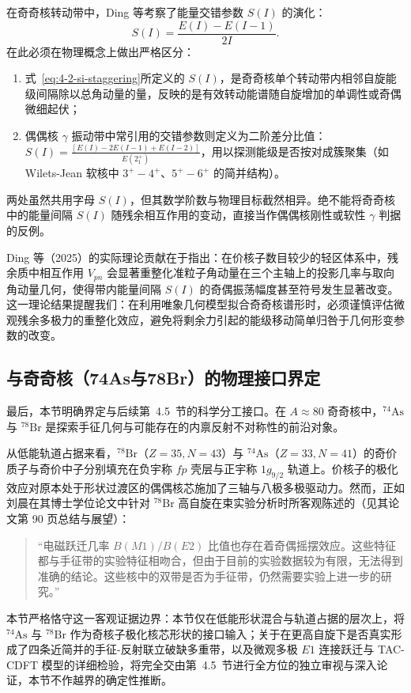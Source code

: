 在奇奇核转动带中，Ding 等考察了能量交错参数 $S(I)$ 的演化：
\begin{equation}\label{eq:4-2-si-staggering}
S(I) = \frac{E(I) - E(I-1)}{2I}.
\end{equation}
在此必须在物理概念上做出严格区分：
\begin{enumerate}
\item 式~\eqref{eq:4-2-si-staggering}所定义的 $S(I)$，是奇奇核单个转动带内相邻自旋能级间隔除以总角动量的量，反映的是有效转动能谱随自旋增加的单调性或奇偶微细起伏；
\item 偶偶核 $\gamma$ 振动带中常引用的交错参数则定义为二阶差分比值：$S(I) = \frac{[E(I) - 2E(I-1) + E(I-2)]}{E(2^+_1)}$，用以探测能级是否按对成簇聚集（如 Wilets-Jean 软核中 $3^+-4^+$、$5^+-6^+$ 的简并结构）。
\end{enumerate}
两处虽然共用字母 $S(I)$，但其数学阶数与物理目标截然相异。绝不能将奇奇核中的能量间隔 $S(I)$ 随残余相互作用的变动，直接当作偶偶核刚性或软性 $\gamma$ 判据的反例。

Ding 等（2025）的实际理论贡献在于指出：在价核子数目较少的轻区体系中，残余质中相互作用 $V_{pn}$ 会显著重整化准粒子角动量在三个主轴上的投影几率与取向角动量几何，使得带内能量间隔 $S(I)$ 的奇偶振荡幅度甚至符号发生显著改变。这一理论结果提醒我们：在利用唯象几何模型拟合奇奇核谱形时，必须谨慎评估微观残余多极力的重整化效应，避免将剩余力引起的能级移动简单归咎于几何形变参数的改变。

\subsection{与奇奇核（74As与78Br）的物理接口界定}\label{sec:4-2-6}

最后，本节明确界定与后续第~4.5~节的科学分工接口。在 $A\approx 80$ 奇奇核中，$^{74}\mathrm{As}$ 与 $^{78}\mathrm{Br}$ 是探索手征几何与可能存在的内禀反射不对称性的前沿对象。

从低能轨道占据来看，$^{78}\mathrm{Br}$（$Z=35, N=43$）与 $^{74}\mathrm{As}$（$Z=33, N=41$）的奇价质子与奇价中子分别填充在负宇称 $fp$ 壳层与正宇称 $1g_{9/2}$ 轨道上。价核子的极化效应对原本处于形状过渡区的偶偶核芯施加了三轴与八极多极驱动力。然而，正如刘晨在其博士学位论文\cite{liu-chen-2016-78br-chirality-reflection-symmetry-thesis}中针对 $^{78}\mathrm{Br}$ 高自旋在束实验分析时所客观陈述的（见其论文第 90 页总结与展望）：
\begin{quote}
``电磁跃迁几率 $B(M1)/B(E2)$ 比值也存在着奇偶摇摆效应。这些特征都与手征带的实验特征相吻合，但由于目前的实验数据较为有限，无法得到准确的结论。这些核中的双带是否为手征带，仍然需要实验上进一步的研究。''
\end{quote}

本节严格恪守这一客观证据边界：本节仅在低能形状混合与轨道占据的层次上，将 $^{74}\mathrm{As}$ 与 $^{78}\mathrm{Br}$ 作为奇核子极化核芯形状的接口输入；关于在更高自旋下是否真实形成了四条近简并的手征-反射联立破缺多重带，以及微观多极 $E1$ 连接跃迁与 TAC-CDFT 模型的详细检验，将完全交由第~4.5~节进行全方位的独立审视与深入论证，本节不作越界的确定性推断。
